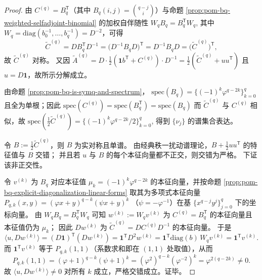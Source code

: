 \begin{proof}
由 \(C^{(q)}=B_q^{\mathsf T}\)（其中 \(B_q(i,j)=\binom{q-j}{i}\)）与命题 \ref{prop:pom-bq-weighted-selfadjoint-binomial} 的加权自伴随性
\(
W_qB_q=B_q^{\mathsf T}W_q
\),
其中 \(W_q=\mathrm{diag}(b_0^{-1},\dots,b_q^{-1})=D^{-2}\)，可得
\[
\widetilde C^{(q)}
=D B_q^{\mathsf T}D^{-1}
=\bigl(D^{-1}B_qD\bigr)^{\mathsf T}
=D^{-1}B_qD
=\bigl(\widetilde C^{(q)}\bigr)^{\mathsf T},
\]
故 \(\widetilde C^{(q)}\) 对称。
又因
\(
\widetilde A^{(q)}=D\cdot \frac12(\mathbf{1}b^{\mathsf T}+C^{(q)})\cdot D^{-1}
=\frac12(\widetilde C^{(q)}+uu^{\mathsf T})
\)
且 \(u=D\mathbf{1}\)，故所示分解成立。
\par
由命题 \ref{prop:pom-bq-is-symq-and-spectrum}，
\(
\mathrm{spec}(B_q)=\{(-1)^k\varphi^{q-2k}\}_{k=0}^{q}
\)
且全为单根；因此
\(
\mathrm{spec}(C^{(q)})=\mathrm{spec}(B_q^{\mathsf T})=\mathrm{spec}(B_q)
\)
而 \(\widetilde C^{(q)}\) 与 \(C^{(q)}\) 相似，故
\(
\mathrm{spec}(\tfrac12\widetilde C^{(q)})=\{(-1)^k\varphi^{q-2k}/2\}_{k=0}^{q}
\),
得到 \(\{\nu_j\}\) 的谱集合表达。
\par
令 \(B:=\frac12\widetilde C^{(q)}\)，则 \(B\) 为实对称且单谱。
由经典秩一扰动谱理论，\(B+\frac12 uu^{\mathsf T}\) 的特征值与 \(B\) 交错；
并且若 \(u\) 与 \(B\) 的每个本征向量都不正交，则交错为严格。
下证该非正交性。
\par
令 \(v^{(k)}\) 为 \(B_q\) 对应本征值 \(\mu_k=(-1)^k\varphi^{q-2k}\) 的本征向量，并按命题 \ref{prop:pom-bq-explicit-diagonalization-linear-forms} 取其为多项式本征向量
\(
P_{q,k}(x,y)=(\varphi x+y)^{q-k}(\psi x+y)^k
\)
（\(\psi=-\varphi^{-1}\)）在基 \(\{x^{q-j}y^j\}_{j=0}^{q}\) 下的坐标向量。
由 \(W_qB_q=B_q^{\mathsf T}W_q\) 可知
\(
w^{(k)}:=W_qv^{(k)}
\)
为 \(C^{(q)}=B_q^{\mathsf T}\) 的本征向量且本征值仍为 \(\mu_k\)；
因此 \(Dw^{(k)}\) 为 \(\widetilde C^{(q)}=DC^{(q)}D^{-1}\) 的本征向量。
于是
\[
\bigl\langle u, Dw^{(k)}\bigr\rangle
=(D\mathbf{1})^{\mathsf T}(Dw^{(k)})
=\mathbf{1}^{\mathsf T}D^{2}w^{(k)}
=\mathbf{1}^{\mathsf T}\mathrm{diag}(b)\,W_qv^{(k)}
=\mathbf{1}^{\mathsf T}v^{(k)}.
\]
而 \(\mathbf{1}^{\mathsf T}v^{(k)}\) 等于 \(P_{q,k}(1,1)\)（系数求和即在 \((1,1)\) 处取值），从而
\[
P_{q,k}(1,1)=(\varphi+1)^{q-k}(\psi+1)^{k}=(\varphi^2)^{q-k}(\varphi^{-2})^{k}=\varphi^{2(q-2k)}\neq 0.
\]
故 \(\langle u, Dw^{(k)}\rangle\neq 0\) 对所有 \(k\) 成立，严格交错成立。证毕。
\end{proof}

